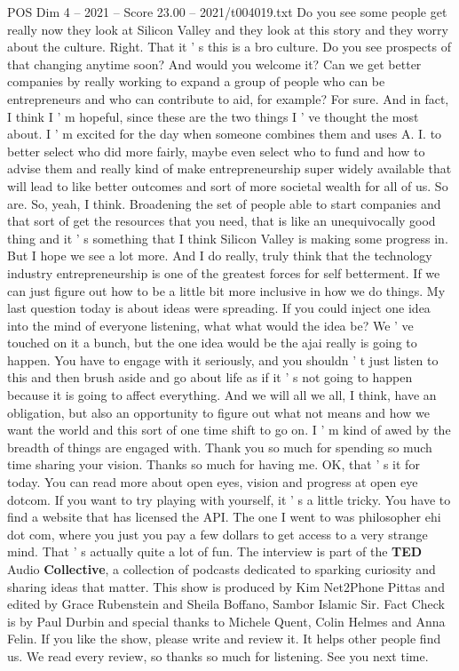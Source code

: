 \begin{textsample}{POS Dim 4 – 2021 – Score 23.00 – 2021/t004019.txt}
Do you see some people get really now they look at Silicon Valley and they look at this story and they worry about the culture.
Right.
That it ' s this is a bro culture.
Do you see prospects of that changing anytime soon?
And would you welcome it?
Can we get better companies by really working to expand a group of people who can be entrepreneurs and who can contribute to aid, for example?
For sure.
And in fact, I think I ' m hopeful, since these are the two things I ' ve thought the most about.
I ' m excited for the day when someone combines them and uses A.
I. to better select who did more fairly, maybe even select who to fund and how to advise them and really kind of make entrepreneurship super widely available that will lead to like better outcomes and sort of more societal wealth for all of us.
So are.
So, yeah, I think.
Broadening the set of people able to start companies and that sort of get the resources that you need, that is like an unequivocally good thing and it ' s something that I think Silicon Valley is making some progress in.
But I hope we see a lot more.
And I do really, truly think that the technology industry entrepreneurship is one of the greatest forces for self betterment.
If we can just figure out how to be a little bit more inclusive in how we do things.
My last question today is about ideas were spreading.
If you could inject one idea into the mind of everyone listening, what what would the idea be?
We ' ve touched on it a bunch, but the one idea would be the ajai really is going to happen.
You have to engage with it seriously, and you shouldn ' t just listen to this and then brush aside and go about life as if it ' s not going to happen because it is going to affect everything.
And we will all we all, I think, have an obligation, but also an opportunity to figure out what not means and how we want the world and this sort of one time shift to go on.
I ' m kind of awed by the breadth of things are engaged with.
Thank you so much for spending so much time sharing your vision.
Thanks so much for having me.
OK, that ' s it for today.
You can read more about open eyes, vision and progress at open eye dotcom.
If you want to try playing with yourself, it ' s a little tricky.
You have to find a website that has licensed the API.
The one I went to was philosopher ehi dot com, where you just you pay a few dollars to get access to a very strange mind.
That ' s actually quite a lot of fun.
The interview is part of the \textbf{TED} Audio \textbf{Collective}, a collection of podcasts dedicated to sparking curiosity and sharing ideas that matter.
This show is produced by Kim Net2Phone Pittas and edited by Grace Rubenstein and Sheila Boffano, Sambor Islamic Sir.
Fact Check is by Paul Durbin and special thanks to Michele Quent, Colin Helmes and Anna Felin.
If you like the show, please write and review it.
It helps other people find us.
We read every review, so thanks so much for listening.
See you next time.

\end{textsample}
